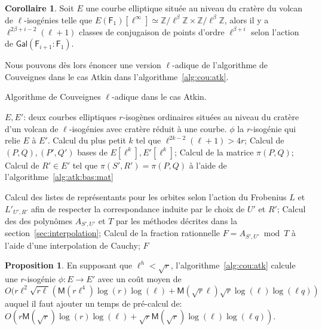 \documentclass[10pt,a4paper]{book}
\theoremstyle{plain}
\theoremstyle{definition}
\theoremstyle{definition}
\theoremstyle{definition}
\newtheorem{cor}[thm]{Corollaire}
\theoremstyle{definition}
\newtheorem{prop}[thm]{Proposition}
\theoremstyle{definition}
\theoremstyle{remark}
\theoremstyle{remark}
\theoremstyle{definition}
\begin{document}
\begin{cor} \label{cor:atk:orb:rep}
Soit $E$ une courbe elliptique située au niveau du cratère du volcan de 
$\ell$-isogénies telle que $E(\mathsf{F}_1)[\ell^{\infty}] \simeq 
\mathbb{Z}/ \ell^{\beta} \mathbb{Z} \times \mathbb{Z}/ \ell^{\beta}\mathbb{Z}$,
alors il y a $\ell^{2\beta + i -2}(\ell+1)$ classes de conjugaison de points 
d'ordre $\ell^{\beta+i}$ selon l'action de $\mathsf{Gal}(
\mathsf{F}_{i+1}:\mathsf{F}_{1})$.
\end{cor}


Nous pouvons dès lors énoncer une version $\ell$-adique de l'algorithme de 
Couveignes dans le cas Atkin dans l'algorithme~\ref{alg:cou:atk}.
\begin{algorithm}
\caption{\label{alg:cou:atk} Algorithme de Couveignes $\ell$-adique dans le cas Atkin.}
\begin{algorithmic}[1]
\REQUIRE $E,E'$: deux courbes elliptiques $r$-isogènes ordinaires situées au niveau du cratère d'un volcan de $\ell$-isogénies avec cratère réduit à une courbe.
\ENSURE $\phi$ la $r$-isogénie qui relie $E$ à $E'$.
\STATE Calcul du plus petit $k$ tel que $\ell^{2k-2}(\ell+1)>4r$;
\STATE \label{alg:cou:atk:bas} 
Calcul de $(P,Q),(P',Q')$ bases de $E[\ell^k],E'[\ell^k]$;
\STATE \label{alg:cou:atk:frob:bas} Calcul de la matrice $\pi(P,Q)$;
 \label{alg:cou:atk:parc:poi}
\STATE \label{alg:cou:atk:matc:fro} Calcul de $R' \in E'$ tel que $\pi(S',R')=\pi(P,Q)$ à l'aide de l'algorithme~\ref{alg:atk:bas:mat}
 \label{alg:cou:atk:div:h}

\STATE Calcul des listes de représentants pour les orbites selon l'action du Frobenius $L$ et $L'_{U',R'}$ afin de respecter la correspondance induite par le choix de $U'$ et $R'$; \label{alg:cou:atk:rep}
\STATE \label{alg:cou:atk:int} Calcul des des polynômes $A_{S',U'}$ et $T$ par les méthodes décrites dans la section~\ref{sec:interpolation};
\STATE \label{alg:cou:atk:Cauchy} Calcul de la fraction rationnelle $F=A_{S',U'} \bmod T$ à l'aide d'une interpolation de Cauchy;
 \label{alg:cou:atk:test}
\RETURN $F$
\ENDIF
\ENDFOR
\ENDFOR 
\end{algorithmic}
\end{algorithm}

\begin{prop}
  \label{pro:atk:full-complexity}
  En supposant que $\ell^h<\sqrt{r}$, 
  l'algorithme~\ref{alg:cou:atk} calcule une $r$-isogénie 
  ${\phi:E \rightarrow E'}$ avec un coût moyen de \[
  O(r \ell^2 \sqrt{r \ell}(\mathsf{M}(r\ell^4)\log(r)\log(\ell)+\mathsf{M}(\sqrt{r}\ell)\sqrt{r}\log(\ell)\log(\ell q))\]
auquel il faut ajouter un temps de pré-calcul de:
$O(r \mathsf{M}(\sqrt{r})\log(r)\log(\ell)+ \sqrt{r} \mathsf{M}(\sqrt{r})\log(\ell)\log(\ell q))$.
\end{prop}
\end{document}
